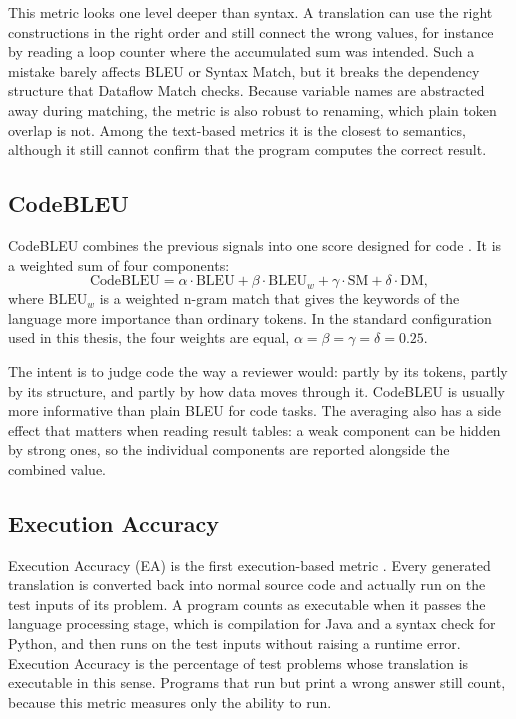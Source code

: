 This metric looks one level deeper than syntax. A translation can use the
right constructions in the right order and still connect the wrong values, for
instance by reading a loop counter where the accumulated sum was intended.
Such a mistake barely affects BLEU or Syntax Match, but it breaks the
dependency structure that Dataflow Match checks. Because variable names are
abstracted away during matching, the metric is also robust to renaming, which
plain token overlap is not. Among the text-based metrics it is the closest to
semantics, although it still cannot confirm that the program computes the
correct result.

\subsection{CodeBLEU}

\quad CodeBLEU combines the previous signals into one score designed for code
\cite{ren2020codebleu}. It is a weighted sum of four components:
\[
\text{CodeBLEU} = \alpha \cdot \text{BLEU} + \beta \cdot \text{BLEU}_{w} +
\gamma \cdot \text{SM} + \delta \cdot \text{DM},
\]
where $\text{BLEU}_{w}$ is a weighted n-gram match that gives the keywords of
the language more importance than ordinary tokens. In the standard
configuration used in this thesis, the four weights are equal,
$\alpha = \beta = \gamma = \delta = 0.25$.

The intent is to judge code the way a reviewer would: partly by its tokens,
partly by its structure, and partly by how data moves through it. CodeBLEU is
usually more informative than plain BLEU for code tasks. The averaging also
has a side effect that matters when reading result tables: a weak component
can be hidden by strong ones, so the individual components are reported
alongside the combined value.

\subsection{Execution Accuracy}

\quad Execution Accuracy (EA) is the first execution-based metric
\cite{ahmad2023avatar}. Every generated translation is converted back into
normal source code and actually run on the test inputs of its problem. A
program counts as executable when it passes the language processing stage,
which is compilation for Java and a syntax check for Python, and then runs on
the test inputs without raising a runtime error. Execution Accuracy is the
percentage of test problems whose translation is executable in this sense.
Programs that run but print a wrong answer still count, because this metric
measures only the ability to run.

